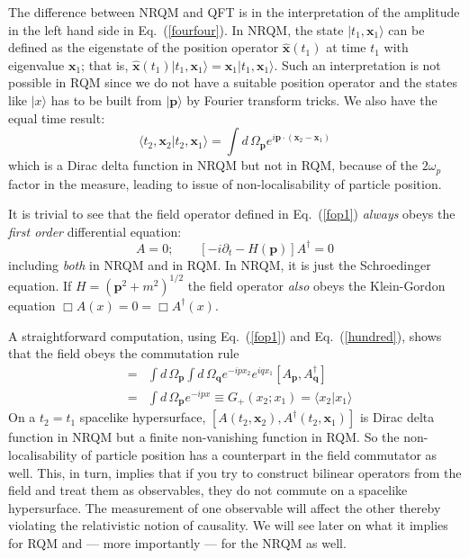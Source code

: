 \documentclass[12pt]{article}
\def\eq#1{{Eq.~(\ref{#1})}}
\def\ket#1{|#1\rangle}                    %
\def\amp#1#2{\langle #1 | #2\rangle}      %
\begin{document}
 The  difference between NRQM and QFT is in the interpretation of the amplitude in the left hand side in \eq{fourfour}. In NRQM, the state $\ket{t_1,\bm{x}_1}$ can be defined as the eigenstate of the position operator $\bm{\hat{x}}(t_1)$ at time $t_1$ with eigenvalue $\bm{x}_1$; that is, $\bm{\hat{x}}(t_1)\ket{t_1,\bm{x}_1}=
 \bm{x}_1 \ket{t_1,\bm{x}_1}$. Such an interpretation is not possible in RQM since we do not have a suitable position operator and the states like $\ket{x}$ has to be built from $\ket{\bm{p}}$ by Fourier transform tricks. We also have the equal time result:
 \begin{equation}
  \amp{t_2,\bm{x}_2}{t_2,\bm{x}_1}=\int d\,\Omega_{\bm{p}}e^{i\bm{p}\cdot(\bm{x}_2-\bm{x}_1)}
  \end{equation} 
 which is a Dirac delta function in NRQM but not in RQM, because of the $2\omega_p$ factor in the measure, leading to issue of
 non-localisability of particle position. 
 
 It is trivial to see that the field operator defined in \eq{fop1} \textit{always} obeys the \textit{first order} differential equation:
 \begin{equation}
  [i\partial_t-H(\bm{p})]A=0;\qquad  [-i\partial_t-H(\bm{p})]A^\dagger=0
 \end{equation} 
  including \textit{both} in NRQM and in RQM.  In NRQM, it is just the Schroedinger equation. If $H=(\bm{p}^2+m^2)^{1/2}$ the field operator \textit{also} obeys the Klein-Gordon equation $\Box A(x) = 0 = \Box A^\dagger(x)$. 
  
 
  A straightforward computation, using \eq{fop1} and \eq{hundred}, shows that the field obeys the commutation rule 
\begin{eqnarray}
 [A(x_2), A^\dagger(x_1)] &=& \int d\,\Omega_{\bm{p}}\int d\,\Omega_{\bm{q}} e^{-ipx_2}e^{iqx_1}[A_{\bm{p}},A^\dagger_{\bm{q}}]\nonumber\\
&=& \int d\,\Omega_{\bm{p}}e^{-ipx} \equiv G_+(x_2;x_1) =\amp{x_2}{x_1}
\label{hundredthree}
\end{eqnarray}
 On a $t_2=t_1$ spacelike hypersurface, 
$[A(t_2,\bm{x}_2), A^\dagger(t_2,\bm{x}_1)]$ is Dirac delta function in NRQM but a finite non-vanishing function in RQM. So the non-localisability of particle position has a counterpart in the field commutator as well. This, in turn, implies that if you try to construct bilinear operators from the field
and treat them as observables, they do not commute on a spacelike hypersurface. The measurement of one observable will affect the other thereby violating the relativistic notion of causality. We will see later on what it implies for RQM and --- more importantly --- for the NRQM as well.
\end{document}
